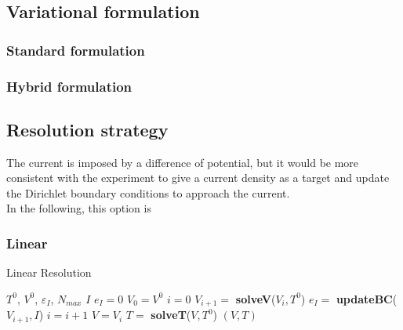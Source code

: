 \subsection{Variational formulation}
\subsubsection{Standard formulation}
\subsubsection{Hybrid formulation}

\subsection{Resolution strategy}
The current is imposed by a difference of potential, but it would be more
consistent with the experiment to give a current density as a target and
update the Dirichlet boundary conditions to approach the current.\\
In the following, this option is
\subsubsection{Linear}
\begin{algorithm}[H]
  \caption{Linear Resolution}
  \label{algo:et-linear}
  \begin{algorithmic}
    \REQUIRE $T^0$, $V^0$, $\varepsilon_I$, $N_{max}$
    \ENSURE $I$
    \STATE $e_I=0$
    \STATE $V_0=V^0$
    \STATE $i=0$
    \vspace{0.3cm}
    \REPEAT
      \STATE $V_{i+1} =$ \textbf{solveV}($V_i,T^0$)
        \STATE $e_I =$ \textbf{updateBC}($V_{i+1},I$)
      \ENDIF
      \STATE $i = i+1$
    \STATE $V=V_i$
    \STATE $T =$ \textbf{solveT}($V,T^0$)
    \RETURN $(V,T)$
  \end{algorithmic}
\end{algorithm}

